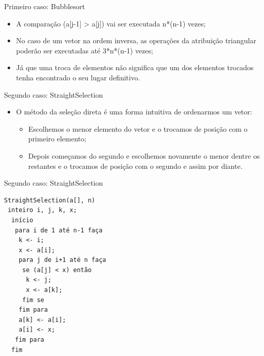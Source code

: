 \documentclass[12pt,table,xcolor={dvipsnames}]{beamer}
\begin{document}
\begin{frame}[fragile]{Primeiro caso: Bubblesort}
\begin{itemize}
\item A comparação (a[j-1] > a[j]) vai ser executada n*(n-1) vezes; 
\item No caso de um vetor na ordem inversa, as operações da atribuição triangular poderão ser executadas até 3*n*(n-1) vezes;
\item Já que uma troca de elementos não significa que um dos elementos trocados tenha encontrado o seu lugar definitivo.
\end{itemize}
\end{frame}

\begin{frame}[fragile]{Segundo caso: StraightSelection}
\begin{itemize}
\item O método da seleção direta é uma forma intuitiva de ordenarmos um vetor:
\begin{itemize}
\item Escolhemos o menor elemento do vetor e o trocamos de posição com o primeiro elemento;
\item Depois começamos do segundo e escolhemos novamente o menor dentre os restantes e o trocamos de posição com o segundo e assim por diante.
\end{itemize}
\end{itemize}
\end{frame}

\begin{frame}[fragile]{Segundo caso: StraightSelection}
\begin{lstlisting}
StraightSelection(a[], n)
 inteiro i, j, k, x;
  início
   para i de 1 até n-1 faça
    k <- i;
    x <- a[i];
    para j de i+1 até n faça
     se (a[j] < x) então
      k <- j;
      x <- a[k];
     fim se
    fim para
    a[k] <- a[i];
    a[i] <- x;
   fim para
  fim
\end{lstlisting}
\end{frame}
\end{document}
